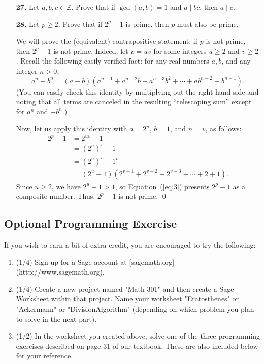 \documentclass[12pt,reqno]{amsart}
\begin{document}
\begin{enumerate}
\medskip

\item[{\bf 27.}]
Let $a, b, c \in {\mathbb Z}$.  Prove that if $\gcd(a,b) = 1$ and $a  \mid bc$, then $a  \mid  c$. 

\bigskip
 
\item[{\bf 28.}]
Let $p \geq 2$.  Prove that if $2^p-1$ is prime, then $p$ must also be prime.

\medskip

 We will prove the (equivalent) contrapositive statement: if $p$ is
not prime, then $2^p-1$ is not prime.  Indeed, let $p = uv$ for some integers
$u\geq 2$ and $v \geq 2$.  Recall the following easily verified fact: for 
any real numbers $a, b$, and any integer $n>0$,
\[
a^{n} - b^{n} = (a-b)(a^{n-1} + a^{n-2}b + a^{n-3}b^2 + \cdots
+ ab^{n-2} + b^{n-1}).
\]
(You can easily check this identity by multiplying out the right-hand side and
noting that all terms are canceled in the resulting ``telescoping sum'' except
for $a^{n}$ and $-b^{n}$.)

Now, let us apply this identity with $a = 2^u$, $b= 1$, and $n = v$, as follows:
\begin{align}\label{eq:3}
2^{p} - 1 &= 2^{uv} - 1\nonumber \\ 
&=(2^u)^v - 1\nonumber\\
&=(2^u)^v - 1^v\nonumber\\
&=(2^u-1)(2^{v-1} + 2^{v-2} + 2^{v-3} + \cdots
+ 2 + 1).
\end{align}
Since $u\geq 2$, we have $2^u-1 > 1$, so Equation~(\ref{eq:3}) presents
$2^{p} - 1$ as a composite number. Thus, $2^{p} - 1$ is not prime. \qed




\end{enumerate}

\newpage 
 
\subsection*{Optional Programming Exercise}
 
If you wish to earn a bit of extra credit, you are encouraged to try the following:

\begin{enumerate}
\item 
(1/4) Sign up for a Sage account at [sagemath.org](http://www.sagemath.org).  

\item (1/4) Create a new project named "Math 301" and then create a Sage Worksheet
  within that project.  Name your worksheet "Eratosthenes" or "Ackermann" or
  "DivisionAlgorithm" (depending on which problem you plan to solve in the next part).

\item (1/2) In the worksheet you created above, solve one of the three programming
  exercises described on page 31 of our textbook.  These are also included below for your reference.
\end{enumerate}
\end{document}
